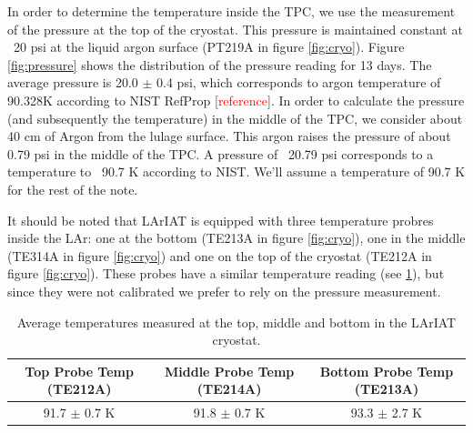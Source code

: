 In order to determine the temperature inside the TPC, we use the measurement of the pressure at the top of the cryostat. This pressure is maintained constant at ~20 psi at the liquid argon surface (PT219A in figure \ref{fig:cryo}). Figure \ref{fig:pressure} shows the distribution of the pressure reading for 13 days.
The average pressure is 20.0 $\pm$ 0.4 psi,  which corresponds to argon temperature of  90.328K  according to NIST RefProp [\textcolor{red}{reference}]. In order to calculate the pressure (and subsequently the temperature) in the middle of the TPC, we consider about 40 cm of Argon from the lulage surface. This argon raises the pressure of about 0.79 psi in the middle of the TPC. A pressure of ~20.79 psi corresponds to a temperature to ~90.7 K according to NIST. We'll assume a temperature of 90.7 K for the rest of the note.

It should be noted that LArIAT is equipped with three temperature probres inside the LAr: one at the bottom (TE213A in figure \ref{fig:cryo}), one in the middle (TE314A in figure \ref{fig:cryo}) and one on the top of the cryostat (TE212A in figure \ref{fig:cryo}). These probes have a similar temperature reading (see \ref{tab:temp}), but since they were not calibrated we prefer to rely on the pressure measurement.

\begin{table}[]
\centering
\caption{Average temperatures measured at the top, middle and bottom in the LArIAT cryostat.}
\label{tab:temp}
\begin{tabular}{|c|c|c|}
\hline
Top Probe Temp (TE212A) & Middle Probe Temp (TE214A)   & Bottom Probe Temp (TE213A)  \\ \hline
91.7 $\pm$ 0.7 K &  91.8 $\pm$ 0.7 K                   & 93.3 $\pm$ 2.7 K       \\ \hline
\end{tabular}
\end{table}


